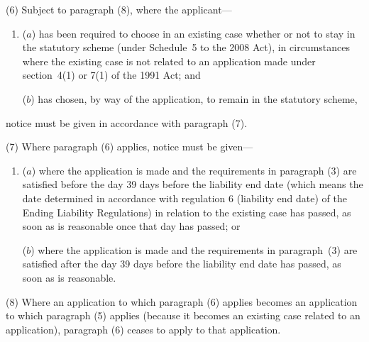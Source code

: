 \documentclass[12pt,a4paper]{article}
\begin{document}
(6) Subject to paragraph (8), where the applicant—
\begin{enumerate}\item[]
($a$) has been required to choose in an existing case whether or not to stay in the statutory scheme (under Schedule~5 to the 2008 Act), in circumstances where the existing case is not related to an application made under section~4(1) or 7(1) of the 1991 Act; and

($b$) has chosen, by way of the application, to remain in the statutory scheme,
\end{enumerate}
notice must be given in accordance with paragraph (7).

(7) Where paragraph (6) applies, notice must be given—
\begin{enumerate}\item[]
($a$) where the application is made and the requirements in paragraph (3) are satisfied before the day 39 days before the liability end date (which means the date determined in accordance with regulation 6 (liability end date) of the Ending Liability Regulations) in relation to the existing case has passed, as soon as is reasonable once that day has passed; or

($b$) where the application is made and the requirements in paragraph~(3) are satisfied after the day 39 days before the liability end date has passed, as soon as is reasonable.
\end{enumerate}

(8) Where an application to which paragraph (6) applies becomes an application to which paragraph (5) applies (because it becomes an existing case related to an application), paragraph (6) ceases to apply to that application.
\end{document}
